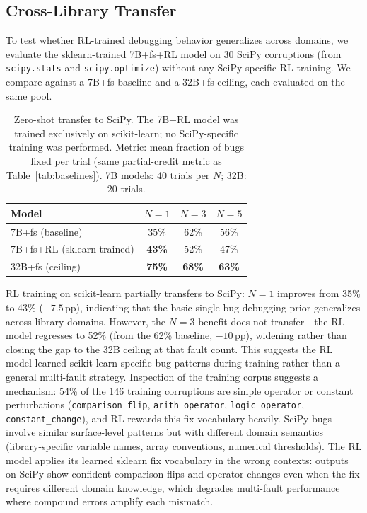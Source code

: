 \documentclass[12pt]{article}
\begin{document}
\subsection{Cross-Library Transfer}
\label{sec:transfer}

To test whether RL-trained debugging behavior generalizes across domains, we
evaluate the sklearn-trained 7B+fs+RL model on 30 SciPy corruptions (from
\texttt{scipy.stats} and \texttt{scipy.optimize}) without any SciPy-specific
RL training. We compare against a 7B+fs baseline and a 32B+fs ceiling, each
evaluated on the same pool.

\begin{table}[h]
\centering
\caption{Zero-shot transfer to SciPy. The 7B+RL model was trained exclusively
  on scikit-learn; no SciPy-specific training was performed. Metric: mean fraction
  of bugs fixed per trial (same partial-credit metric as Table~\ref{tab:baselines}).
  7B models: 40 trials per $N$; 32B: 20 trials.}
\label{tab:scipy}
\begin{tabular}{lccc}
\toprule
Model & $N{=}1$ & $N{=}3$ & $N{=}5$ \\
\midrule
7B+fs (baseline)          & 35\% & 62\% & 56\% \\
7B+fs+RL (sklearn-trained) & \textbf{43\%} & 52\% & 47\% \\
\midrule
32B+fs (ceiling)          & \textbf{75\%} & \textbf{68\%} & \textbf{63\%} \\
\bottomrule
\end{tabular}
\end{table}

RL training on scikit-learn partially transfers to SciPy: $N{=}1$ improves
from 35\% to 43\% ($+7.5$\,pp), indicating that the basic single-bug
debugging prior generalizes across library domains. However, the $N{=}3$
benefit does not transfer---the RL model regresses to 52\% (from the 62\%
baseline, $-10$\,pp), widening rather than closing the gap to the 32B ceiling
at that fault count. This suggests the RL model learned scikit-learn-specific
bug patterns during training rather than a general multi-fault strategy.
Inspection of the training corpus suggests a mechanism: 54\% of the 146
training corruptions are simple operator or constant perturbations
(\texttt{comparison\_flip}, \texttt{arith\_operator}, \texttt{logic\_operator},
\texttt{constant\_change}), and RL rewards this fix vocabulary heavily.
SciPy bugs involve similar surface-level patterns but with different
domain semantics (library-specific variable names, array conventions, numerical
thresholds). The RL model applies its learned sklearn fix vocabulary in the
wrong contexts: outputs on SciPy show confident comparison flips and operator
changes even when the fix requires different domain knowledge, which degrades
multi-fault performance where compound errors amplify each mismatch.
\end{document}
